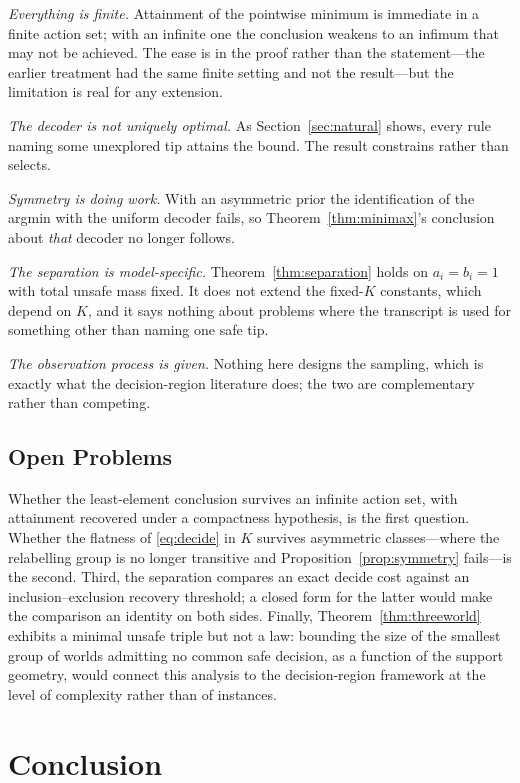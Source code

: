 \documentclass[conference]{IEEEtran}
\theoremstyle{definition}
\begin{document}
\emph{Everything is finite.} Attainment of the pointwise minimum is immediate in a finite
action set; with an infinite one the conclusion weakens to an infimum that may not be achieved.
The ease is in the proof rather than the statement---the earlier treatment had the same finite
setting and not the result---but the limitation is real for any extension.

\emph{The decoder is not uniquely optimal.} As Section~\ref{sec:natural} shows, every rule
naming some unexplored tip attains the bound. The result constrains rather than selects.

\emph{Symmetry is doing work.} With an asymmetric prior the identification of the argmin with
the uniform decoder fails, so Theorem~\ref{thm:minimax}'s conclusion about \emph{that} decoder
no longer follows.

\emph{The separation is model-specific.} Theorem~\ref{thm:separation} holds on
$a_{i}=b_{i}=1$ with total unsafe mass fixed. It does not extend the fixed-$K$ constants,
which depend on $K$, and it says nothing about problems where the transcript is used for
something other than naming one safe tip.

\emph{The observation process is given.} Nothing here designs the sampling, which is exactly
what the decision-region literature does; the two are complementary rather than competing.

\subsection{Open Problems}

Whether the least-element conclusion survives an infinite action set, with attainment recovered
under a compactness hypothesis, is the first question. Whether the flatness of
\eqref{eq:decide} in $K$ survives asymmetric classes---where the relabelling group is no longer
transitive and Proposition~\ref{prop:symmetry} fails---is the second. Third, the separation
compares an exact decide cost against an inclusion--exclusion recovery threshold; a closed form
for the latter would make the comparison an identity on both sides. Finally, Theorem~\ref{thm:threeworld} exhibits a
minimal unsafe triple but not a law: bounding the size of the smallest group of worlds
admitting no common safe decision, as a function of the support geometry, would connect this
analysis to the decision-region framework at the level of complexity rather than of
instances.

\section{Conclusion}
\end{document}

